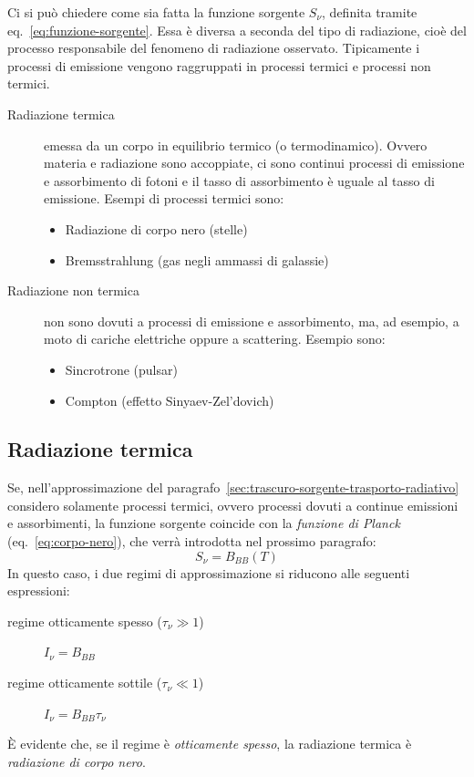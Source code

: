 Ci si può chiedere come sia fatta la funzione sorgente $S_\nu$, definita tramite eq.~\eqref{eq:funzione-sorgente}. Essa è diversa a seconda del tipo di radiazione, cioè del processo responsabile del fenomeno di radiazione osservato. Tipicamente i processi di emissione vengono raggruppati in processi termici e processi non termici.
\begin{description}
    \item[Radiazione termica] emessa da un corpo in equilibrio termico (o termodinamico). Ovvero materia e radiazione sono accoppiate, ci sono continui processi di emissione e assorbimento di fotoni e il tasso di assorbimento è uguale al tasso di emissione. Esempi di processi termici sono:
    \begin{itemize}
        \item Radiazione di corpo nero (stelle)
        \item Bremsstrahlung (gas negli ammassi di galassie)
    \end{itemize}
    
    \item[Radiazione non termica] non sono dovuti a processi di emissione e assorbimento, ma, ad esempio, a moto di cariche elettriche oppure a scattering. Esempio sono:
    \begin{itemize}
        \item Sincrotrone (pulsar)
        \item Compton (effetto Sinyaev-Zel'dovich)
    \end{itemize}
\end{description}

\subsection{Radiazione termica}
Se, nell'approssimazione del paragrafo~\ref{sec:trascuro-sorgente-trasporto-radiativo} considero solamente processi termici, ovvero processi dovuti a continue emissioni e assorbimenti, la funzione sorgente coincide con la \emph{funzione di Planck} (eq.~\eqref{eq:corpo-nero}), che verrà introdotta nel prossimo paragrafo:
\[
    S_\nu = B_{BB} (T)
\]
In questo caso, i due regimi di approssimazione si riducono alle seguenti espressioni:
\begin{description}
    \item[regime otticamente spesso ($\tau_\nu \gg 1$)] $I_\nu = B_{BB}$
    \item[regime otticamente sottile ($\tau_\nu \ll 1$)] $I_\nu = B_{BB} \tau_\nu$
\end{description}
È evidente che, se il regime è \emph{otticamente spesso}, la radiazione termica è \emph{radiazione di corpo nero}.
